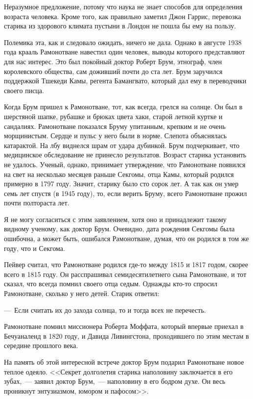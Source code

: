 \documentclass[12pt,a4paper,twoside,openany,svgnames]{memoir}
\begin{document}
Неразумное предложение, потому что наука не знает способов для определения возраста человека. Кроме того, как правильно заметил Джон Гаррис, перевозка старика из здорового климата пустыни в Лондон не пошла бы ему на пользу.

Полемика эта, как и следовало ожидать, ничего не дала. Однако в августе 1938 года крааль Рамонотване навестил один человек, выводы которого представляют для нас интерес. Это был покойный доктор Роберт Брум, этнограф, член королевского общества, сам доживший почти до ста лет. Брум заручился поддержкой Тшекеди Камы, регента Бамангвато, который дал ему в переводчики своего писца.

Когда Брум пришел к Рамонотване, тот, как всегда, грелся на солнце. Он был в шерстяной шапке, рубашке и брюках цвета хаки, старой летной куртке и сандалиях. Рамонотване показался Бруму упитанным, крепким и не очень морщинистым. Сердце и пульс у него были в норме. Слепота объяснялась катарактой. На лбу виднелся шрам от удара дубинкой. Брум подчеркивает, что медицинское обследование не принесло результатов. Возраст старика установить не удалось. Ученый, однако, принимает утверждение, что Рамонотване появился на свет на несколько месяцев раньше Секгомы, отца Камы, который родился примерно в 1797 году. Значит, старику было сто сорок лет. А так как он умер семь лет спустя (в 1945 году), то, если верить Бруму, всего Рамонотване прожил почти полтораста лет.

Я не могу согласиться с этим заявлением, хотя оно и принадлежит такому видному ученому, как доктор Брум. Очевидно, дата рождения Секгомы была ошибочна, а может быть, ошибался Рамонотване, думая, что он родился в том же году, что и Секгома.

Пейвер считал, что Рамонотване родился где-то между 1815 и 1817 годом, скорее всего в 1815 году. Он расспрашивал семидесятилетнего сына Рамонотване, и тот сказал, что всегда помнил своего отца седым. Однажды кто-то спросил Рамонотване, сколько у него детей. Старик ответил:

---~Если считать их до захода солнца, то и тогда всех не перечесть.

Рамонотване помнил миссионера Роберта Моффата, который впервые приехал в Бечуаналенд в 1820 году, и Давида Ливингстона, проходившего по этим местам в середине прошлого века.

На память об этой интересной встрече доктор Брум подарил Рамонотване новое теплое одеяло. <<Секрет долголетия старика наполовину заключается в его зубах,~--- заявил доктор Брум,~--- наполовину в его бодром духе. Он весь проникнут энтузиазмом, юмором и пафосом>>.
\end{document}
